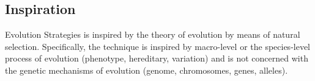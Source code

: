 \subsection{Inspiration}
Evolution Strategies is inspired by the theory of evolution by means of natural selection.
Specifically, the technique is inspired by macro-level or the species-level process of evolution (phenotype, hereditary, variation) and is not concerned with the genetic mechanisms of evolution (genome, chromosomes, genes, alleles).


